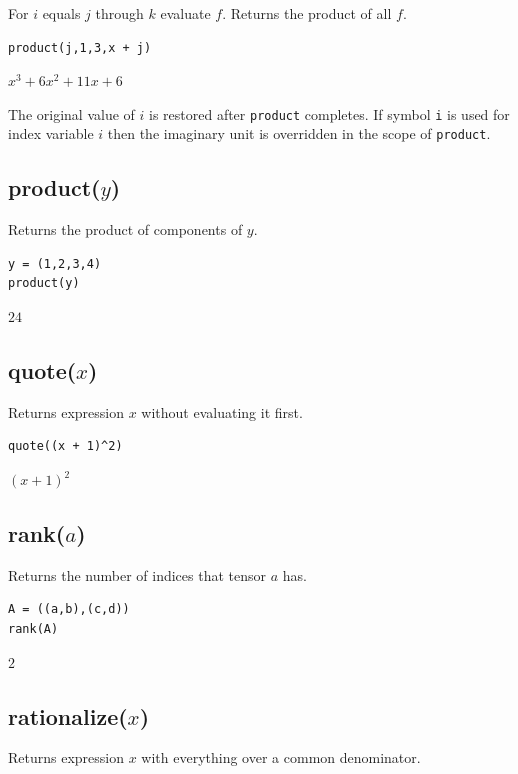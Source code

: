 \documentclass[12pt]{article}
\begin{document}
For $i$ equals $j$ through $k$ evaluate $f$.
Returns the product of all $f$.

{\color{blue}
\begin{verbatim}
product(j,1,3,x + j)
\end{verbatim}
}

$\displaystyle x^3+6x^2+11x+6$

\bigskip
The original value of $i$ is restored after {\tt product} completes.
If symbol {\tt i} is used for index variable $i$
then the imaginary unit is overridden in the scope of {\tt product}.

\subsection*{product($y$)}

Returns the product of components of $y$.

{\color{blue}
\begin{verbatim}
y = (1,2,3,4)
product(y)
\end{verbatim}
}

$24$

\subsection*{quote($x$)}

Returns expression $x$ without evaluating it first.

{\color{blue}
\begin{verbatim}
quote((x + 1)^2)
\end{verbatim}
}

$\displaystyle (x+1)^2$

\subsection*{rank($a$)}

Returns the number of indices that tensor $a$ has.

{\color{blue}
\begin{verbatim}
A = ((a,b),(c,d))
rank(A)
\end{verbatim}
}

$2$

\subsection*{rationalize($x$)}

Returns expression $x$ with everything over a common denominator.
\end{document}
